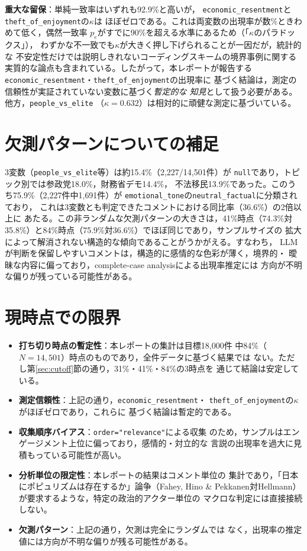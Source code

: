 \documentclass[dvipdfmx, a4paper, 11pt]{jsarticle}
\begin{document}
\textbf{重大な留保}：単純一致率はいずれも92.9\%と高いが，
\texttt{economic\_resentment}と\texttt{theft\_of\_enjoyment}の$\kappa$は
ほぼゼロである。これは両変数の出現率が数\%ときわめて低く，偶然一致率
$p_e$がすでに90\%を超える水準にあるため（「$\kappa$のパラドックス」），
わずかな不一致でも$\kappa$が大きく押し下げられることが一因だが，統計的な
不安定性だけでは説明しきれないコーディングスキームの境界事例に関する
実質的な論点も含まれている。したがって，本レポートが報告する
\texttt{economic\_resentment}・\texttt{theft\_of\_enjoyment}の出現率に
基づく結論は，測定の信頼性が実証されていない変数に基づく\emph{暫定的な
知見}として扱う必要がある。他方，\texttt{people\_vs\_elite}
（$\kappa=0.632$）は相対的に頑健な測定に基づいている。

\section{欠測パターンについての補足}
3変数（\texttt{people\_vs\_elite}等）は約15.4\%（2{,}227/14{,}501件）が
\texttt{null}であり，トピック別では参政党18.0\%，財務省デモ14.4\%，
不法移民13.9\%であった。このうち75.9\%（2{,}227件中1{,}691件）が
\texttt{emotional\_tone}の\texttt{neutral\_factual}に分類されており，
これは3変数とも判定できたコメントにおける同比率（36.6\%）の2倍以上に
あたる。この非ランダムな欠測パターンの大きさは，41\%時点（74.3\%対
35.8\%）と84\%時点（75.9\%対36.6\%）でほぼ同じであり，サンプルサイズの
拡大によって解消されない構造的な傾向であることがうかがえる。すなわち，
LLMが判断を保留しやすいコメントは，構造的に感情的な色彩が薄く，境界的・
曖昧な内容に偏っており，complete-case analysisによる出現率推定には
方向が不明な偏りが残っている可能性がある。

\section{現時点での限界}
\begin{itemize}
  \item \textbf{打ち切り時点の暫定性}：本レポートの集計は目標18{,}000件
    中84\%（$N=14{,}501$）時点のものであり，全件データに基づく結果では
    ない。ただし第\ref{sec:cutoff}節の通り，31\%・41\%・84\%の3時点を
    通じて結論は安定している。
  \item \textbf{測定信頼性}：上記の通り，\texttt{economic\_resentment}・
    \texttt{theft\_of\_enjoyment}の$\kappa$がほぼゼロであり，これらに
    基づく結論は暫定的である。
  \item \textbf{収集順序バイアス}：\texttt{order="relevance"}による収集
    のため，サンプルはエンゲージメント上位に偏っており，感情的・対立的な
    言説の出現率を過大に見積もっている可能性が高い。
  \item \textbf{分析単位の限定性}：本レポートの結果はコメント単位の
    集計であり，「日本にポピュリズムは存在するか」論争（Fahey, Hino \&
    Pekkanen対Hellmann）が要求するような，特定の政治的アクター単位の
    マクロな判定には直接接続しない。
  \item \textbf{欠測パターン}：上記の通り，欠測は完全にランダムでは
    なく，出現率の推定値には方向が不明な偏りが残る可能性がある。
\end{itemize}
\end{document}
